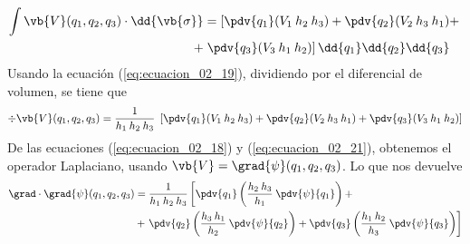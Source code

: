 \begin{align*}
\int \vb{V} (q_{1}, q_{2}, q_{3}) \cdot \dd{\vb{\sigma}} &= \left[ \pdv{q_{1}} (V_{1} \: h_{2} \: h_{3}) + \pdv{q_{2}} (V_{2} \: h_{3} \: h_{1}) + \right. \\
+& \left. \pdv{q_{3}} (V_{3} \: h_{1} \: h_{2}) \right] \dd{q_{1}} \dd{q_{2}} \dd{q_{3}}
\end{align*}
Usando la ecuación (\ref{eq:ecuacion_02_19}), dividiendo por el diferencial de volumen, se tiene que
\begin{align}
\div{\vb{V}} (q_{1}, q_{2}, q_{3}) = \dfrac{1}{h_{1} \: h_{2} \: h_{3}} \; \left[ \pdv{q_{1}} (V_{1} \: h_{2} \: h_{3}) + \pdv{q_{2}} (V_{2}  \:h_{3} \: h_{1}) + \pdv{q_{3}} (V_{3} \: h_{1} \: h_{2})   \right]
\label{eq:ecuacion_02_21}
\end{align}
De las ecuaciones (\ref{eq:ecuacion_02_18}) y (\ref{eq:ecuacion_02_21}), obtenemos el operador Laplaciano, usando $\vb{V} = \grad{\psi} (q_{1}, q_{2}, q_{3})$. Lo que nos devuelve
\begin{align}
\begin{aligned}
\grad \cdot \grad{\psi} (q_{1}, q_{2}, q_{3}) &= \dfrac{1}{h_{1} \: h_{2} \: h_{3}} \left[ \pdv{q_{1}} \left( \dfrac{h_{2} \: h_{3}}{h_{1}} \: \pdv{\psi}{q_{1}} \right) + \right. \\
&+ \left.  \pdv{q_{2}} \left( \dfrac{h_{3} \: h_{1}}{h_{2}} \: \pdv{\psi}{q_{2}} \right) + \pdv{q_{3}} \left( \dfrac{h_{1} \: h_{2}}{h_{3}} \: \pdv{\psi}{q_{3}} \right) \right]  
\end{aligned}
\label{eq:ecuacion_02_22}
\end{align}
